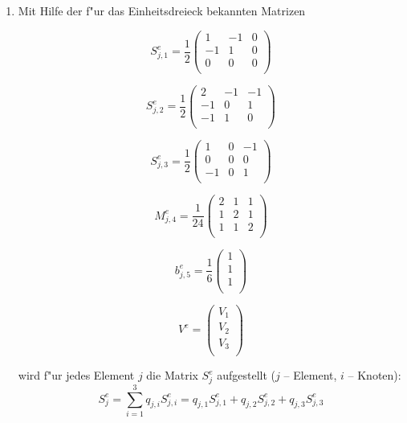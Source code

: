 \begin{description}
\begin{enumerate}
         \item Mit Hilfe der f"ur das Einheitsdreieck bekannten Matrizen

         \parbox{6cm}{$$S_{j,1}^e=\frac{1}{2}\left(\begin{array}{ccc}1&-1&0\\-1&1&0\\0&0&0\\ \end{array}\right)$$}
         \parbox{6cm}{$$S_{j,2}^e=\frac{1}{2}\left(\begin{array}{ccc}2&-1&-1\\-1&0&1\\-1&1&0\\ \end{array}\right)$$}
         \parbox{6cm}{$$S_{j,3}^e=\frac{1}{2}\left(\begin{array}{ccc}1&0&-1\\0&0&0\\-1&0&1\\ \end{array}\right)$$}
         \parbox{6cm}{$$M_{j,4}^e=\frac{1}{24}\left(\begin{array}{ccc}2&1&1\\1&2&1\\1&1&2\\ \end{array}\right)$$}
         \parbox{4cm}{$$b_{j,5}^e=\frac{1}{6}\left(\begin{array}{c}1\\1\\1\\ \end{array}\right)$$}
         \parbox{4cm}{$$V^e=\left(\begin{array}{c}V_1\\V_2\\V_3\\ \end{array}\right)$$}

         wird f"ur jedes Element $j$ die Matrix $S_j^e$ aufgestellt ($j$ -- Element, $i$ -- Knoten):
         $$S_j^e = \sum_{i=1}^3 q_{j,i} S_{j,i}^e = q_{j,1}S_{j,1}^e+q_{j,2}S_{j,2}^e+q_{j,3}S_{j,3}^e$$


\end{enumerate}
\end{description}
